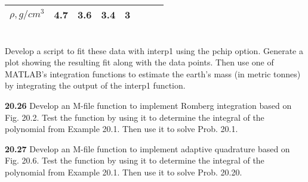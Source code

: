 \documentclass[../main.tex]{subfiles}
\begin{document}
\begin{multicols}{2}
\begin{tabular}{lccccccc}
\scriptsize{\textbf{$\rho, g/cm^{3}$}} & \scriptsize{4.7} & \scriptsize{3.6} & \scriptsize{3.4} & \scriptsize{3} & \vspace{0in} & \vspace{0in} & \vspace{0in}\\ \hline

\end{tabular}\\
Develop a script to fit these data with interp1 using the
pchip option. Generate a plot showing the resulting fit
along with the data points. Then use one of MATLAB's integration functions to estimate the earth's mass (in metric
tonnes) by integrating the output of the interp1 function.

\textbf{20.26} Develop an M-file function to implement Romberg integration based on Fig. 20.2. Test the function by using it to
determine the integral of the polynomial from Example 20.1.
Then use it to solve Prob. 20.1.

\textbf{20.27} Develop an M-file function to implement adaptive
quadrature based on Fig. 20.6. Test the function by using it to
determine the integral of the polynomial from Example 20.1.
Then use it to solve Prob. 20.20.




\end{multicols}
\end{document}
